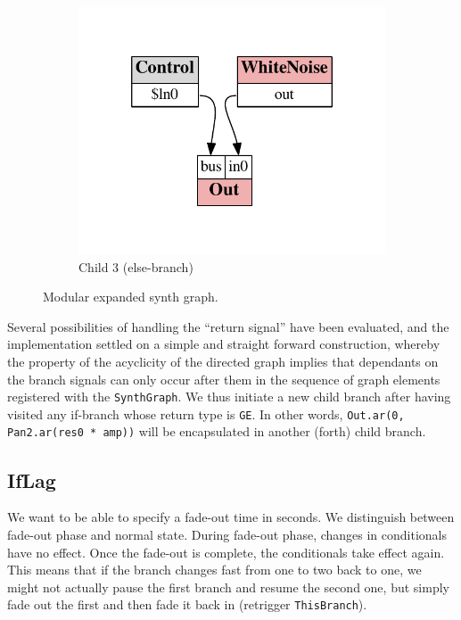 \documentclass[11pt,a4paper]{article}
\begin{document}
\begin{figure}
\begin{subfigure}[b]{0.3\textwidth}
\includegraphics[scale=0.5]{figures/ugen-if-mod-child_3.pdf}
\caption{Child 3 (else-branch)}\label{fig:ugen-mod-c3}
\end{subfigure}
\caption{Modular expanded synth graph.}
\label{fig:ugen-modular}
\end{figure}

Several possibilities of handling the ``return signal'' have been evaluated, and the implementation settled on a simple and straight forward construction, whereby the property of the acyclicity of the directed graph implies that dependants on the branch signals can only occur after them in the sequence of graph elements registered with the \Verb!SynthGraph!. We thus initiate a new child branch after having visited any if-branch whose return type is \Verb!GE!. In other words, \Verb!Out.ar(0, Pan2.ar(res0 * amp))! will be encapsulated in another (forth) child branch.

\subsection{IfLag}

We want to be able to specify a fade-out time in seconds. We distinguish between fade-out phase and normal state. During fade-out phase, changes in conditionals have no effect. Once the fade-out is complete, the conditionals take effect again. This means that if the branch changes fast from one to two back to one, we might not actually pause the first branch and resume the second one, but simply fade out the first and then fade it back in (retrigger \Verb!ThisBranch!).
\end{document}
